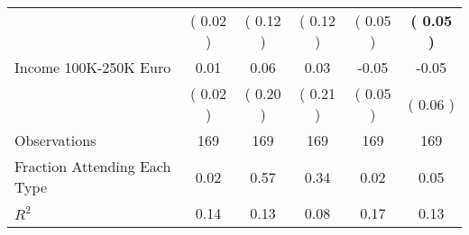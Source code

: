 \begin{table}[H]
{\begin{tabular}{lccccc}
\quad  & (     0.02 ) & (     0.12 )  & (     0.12 )  & (     0.05 ) & \textbf{(     0.05 )} \\
\quad Income 100K-250K Euro &      0.01 &      0.06 &      0.03 &     -0.05 &     -0.05 \\
\quad  & (     0.02 ) & (     0.20 )  & (     0.21 )  & (     0.05 ) & (     0.06 ) \\
\midrule
Observations & 169 & 169 & 169 & 169 & 169 \\
Fraction Attending Each Type &      0.02 &      0.57 &      0.34 &      0.02 &      0.05 \\
\midrule
$ R^2$ &      0.14 &      0.13 &      0.08 &      0.17 &      0.13 \\
\bottomrule
\end{tabular}}
\end{table}
